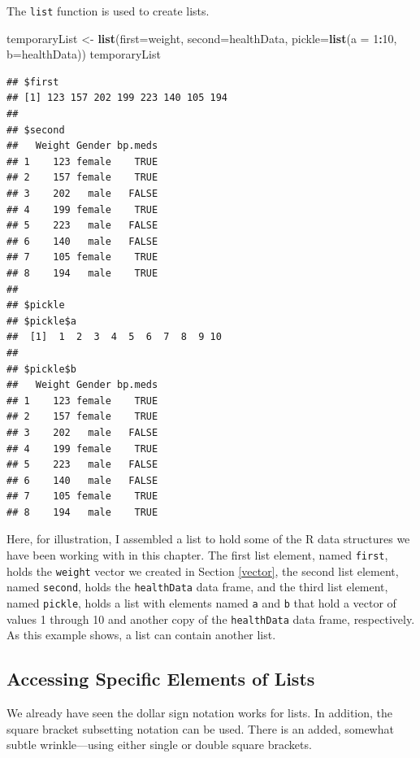 \documentclass[
]{krantz}
\newenvironment{Shaded}{\begin{snugshade}}{\end{snugshade}}
\newcommand{\DataTypeTok}[1]{\textcolor[rgb]{0.13,0.29,0.53}{#1}}
\newcommand{\DecValTok}[1]{\textcolor[rgb]{0.00,0.00,0.81}{#1}}
\newcommand{\KeywordTok}[1]{\textcolor[rgb]{0.13,0.29,0.53}{\textbf{#1}}}
\newcommand{\NormalTok}[1]{#1}
\newcommand{\OperatorTok}[1]{\textcolor[rgb]{0.81,0.36,0.00}{\textbf{#1}}}
\newcommand{\StringTok}[1]{\textcolor[rgb]{0.31,0.60,0.02}{#1}}
\begin{document}
The \texttt{list} function is used to create lists.

\begin{Shaded}
\begin{Highlighting}[]
\NormalTok{temporaryList \textless{}{-}}\StringTok{ }\KeywordTok{list}\NormalTok{(}\DataTypeTok{first=}\NormalTok{weight, }\DataTypeTok{second=}\NormalTok{healthData,}
                      \DataTypeTok{pickle=}\KeywordTok{list}\NormalTok{(}\DataTypeTok{a =} \DecValTok{1}\OperatorTok{:}\DecValTok{10}\NormalTok{, }\DataTypeTok{b=}\NormalTok{healthData))}
\NormalTok{temporaryList}
\end{Highlighting}
\end{Shaded}

\begin{verbatim}
## $first
## [1] 123 157 202 199 223 140 105 194
## 
## $second
##   Weight Gender bp.meds
## 1    123 female    TRUE
## 2    157 female    TRUE
## 3    202   male   FALSE
## 4    199 female    TRUE
## 5    223   male   FALSE
## 6    140   male   FALSE
## 7    105 female    TRUE
## 8    194   male    TRUE
## 
## $pickle
## $pickle$a
##  [1]  1  2  3  4  5  6  7  8  9 10
## 
## $pickle$b
##   Weight Gender bp.meds
## 1    123 female    TRUE
## 2    157 female    TRUE
## 3    202   male   FALSE
## 4    199 female    TRUE
## 5    223   male   FALSE
## 6    140   male   FALSE
## 7    105 female    TRUE
## 8    194   male    TRUE
\end{verbatim}

Here, for illustration, I assembled a list to hold some of the R data structures we have been working with in this chapter. The first list element, named \texttt{first}, holds the \texttt{weight} vector we created in Section \ref{vector}, the second list element, named \texttt{second}, holds the \texttt{healthData} data frame, and the third list element, named \texttt{pickle}, holds a list with elements named \texttt{a} and \texttt{b} that hold a vector of values 1 through 10 and another copy of the \texttt{healthData} data frame, respectively. As this example shows, a list can contain another list.

\hypertarget{accessing-specific-elements-of-lists}{%
\subsection{Accessing Specific Elements of Lists}\label{accessing-specific-elements-of-lists}}

We already have seen the dollar sign notation works for lists. In addition, the square bracket subsetting notation can be used. There is an added, somewhat subtle wrinkle---using either single or double square brackets.
\end{document}
